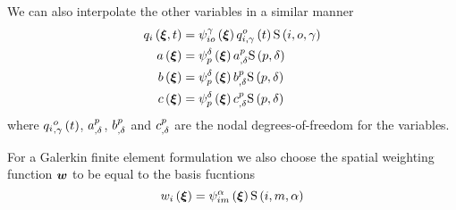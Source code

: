 We can also interpolate the other variables in a similar manner \ie
\begin{equation}
  \begin{split}
    \fnof{q_{i}}{\vect{\xi},t} &= \idxgbfn{i}{o}{\gamma}{\vect{\xi}}
    \fnof{\idxnodedof{q}{i}{o}{\gamma}}{t}\idxgsf{i}{o}{\gamma} \\
    \fnof{a}{\vect{\xi}} &=\gbfn{p}{\delta}{\vect{\xi}}
    \nodedof{a}{p}{\delta}\gsf{p}{\delta} \\
    \fnof{b}{\vect{\xi}} &=\gbfn{p}{\delta}{\vect{\xi}}\nodedof{b}{p}{\delta}
    \gsf{p}{\delta} \\
    \fnof{c}{\vect{\xi}}
    &=\gbfn{p}{\delta}{\vect{\xi}}\nodedof{c}{p}{\delta}\gsf{p}{\delta}
  \end{split}
\end{equation}
where $   {q_{i}}^{o} _{,\gamma} \left( t \right) $, $  {a}^{p} _{,\delta} $,
$  {b}^{p} _{,\delta} $ and $  {c}^{p} _{,\delta} $ are the
nodal degrees-of-freedom for the variables.

For a Galerkin finite element formulation we also choose the spatial weighting
function $\vect{w}$ to be equal to the basis fucntions \ie
\begin{equation}
  \fnof{w_{i}}{\vect{\xi}}=\idxgbfn{i}{m}{\alpha}{\vect{\xi}}\idxgsf{i}{m}{\alpha}
\end{equation}


